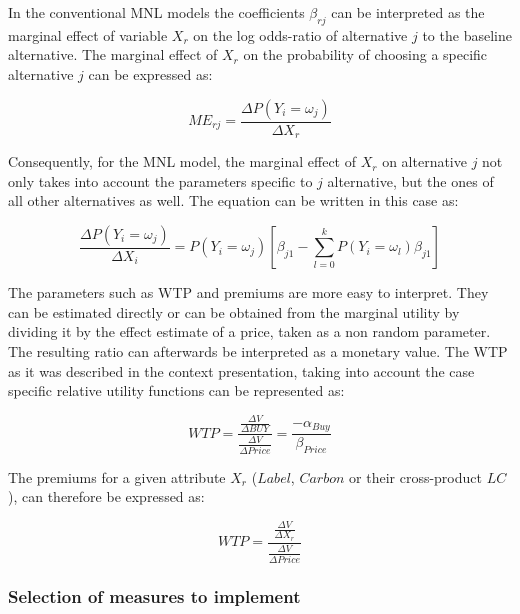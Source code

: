 \documentclass[11pt,]{article}
\begin{document}
In the conventional MNL models the coefficients \(\beta_{rj}\) can be
interpreted as the marginal effect of variable \(X_r\) on the log
odds-ratio of alternative \(j\) to the baseline alternative. The
marginal effect of \(X_r\) on the probability of choosing a specific
alternative \(j\) can be expressed as:

\begin{equation}
ME_{rj} = \frac{
    \Delta P(Y_i = \omega_j) 
}{
    \Delta X_r 
}
\end{equation}

Consequently, for the MNL model, the marginal effect of \(X_r\) on
alternative \(j\) not only takes into account the parameters specific to
\(j\) alternative, but the ones of all other alternatives as well. The
equation can be written in this case as:

\begin{equation}
\frac{
    \Delta P(Y_i = \omega_j) 
}{
    \Delta X_i 
} = P(Y_i = \omega_j) [
    \beta_{j1} - \sum_{l = 0}^k P(Y_i = \omega_l) \beta_{j1}
]
\end{equation}

The parameters such as WTP and premiums are more easy to interpret. They
can be estimated directly or can be obtained from the marginal utility
by dividing it by the effect estimate of a price, taken as a non random
parameter. The resulting ratio can afterwards be interpreted as a
monetary value. The WTP as it was described in the context presentation,
taking into account the case specific relative utility functions can be
represented as:

\begin{equation}
WTP = \frac{
  \frac{\Delta V}{\Delta BUY}
}{
  \frac{\Delta V}{\Delta Price}
} = \frac{
  - \alpha_{Buy}
}{
  \beta_{Price}
}
\end{equation}

The premiums for a given attribute \(X_r\) (\(Label\), \(Carbon\) or
their cross-product \(LC\)), can therefore be expressed as:

\begin{equation}
WTP = \frac{
  \frac{\Delta V}{\Delta X_r}
}{
   \frac{\Delta V}{\Delta Price}
}
\end{equation}

\hypertarget{selection-of-measures-to-implement}{%
\subsubsection{Selection of measures to
implement}\label{selection-of-measures-to-implement}}
\end{document}
